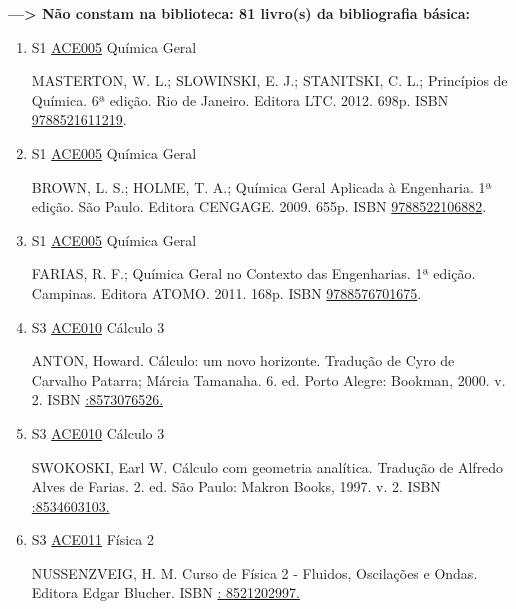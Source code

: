 \documentclass[12pt,a4paper]{book}
\begin{document}
 \textbf{---> Não constam na biblioteca: 81 livro(s) da bibliografia básica:}\label{FALTABIBBAS}
\begin{enumerate}
 \item S1 \hyperref[PUD:ACE005]{ACE005} Química Geral

 MASTERTON, W.  L.;  SLOWINSKI, E.  J.;  STANITSKI, C.  L.;  Princípios de Química.  6ª edição.  Rio de Janeiro.  Editora LTC.  2012.  698p.  ISBN \href{http://www.bn.br/site/pages/servicosProfissionais/agenciaISBN/isbnBusca/FbnBuscaISBNCatalogo.asp?pField=ISBN&pIntPagina=1&pISBN=21611219&nidbISBN=true&hidbISBN=true}{9788521611219}. 
 
 
 \item S1 \hyperref[PUD:ACE005]{ACE005} Química Geral

 BROWN, L.  S.;  HOLME, T.  A.;  Química Geral Aplicada à Engenharia.  1ª edição.  São Paulo.  Editora CENGAGE.  2009.  655p.  ISBN \href{http://www.bn.br/site/pages/servicosProfissionais/agenciaISBN/isbnBusca/FbnBuscaISBNCatalogo.asp?pField=ISBN&pIntPagina=1&pISBN=22106882&nidbISBN=true&hidbISBN=true}{9788522106882}. 
 
 
 \item S1 \hyperref[PUD:ACE005]{ACE005} Química Geral

 FARIAS, R.  F.;  Química Geral no Contexto das Engenharias.  1ª edição.  Campinas.  Editora ATOMO.  2011.  168p.  ISBN \href{http://www.bn.br/site/pages/servicosProfissionais/agenciaISBN/isbnBusca/FbnBuscaISBNCatalogo.asp?pField=ISBN&pIntPagina=1&pISBN=76701675&nidbISBN=true&hidbISBN=true}{9788576701675}.
 \item S3 \hyperref[PUD:ACE010]{ACE010} Cálculo 3

  ANTON, Howard.  Cálculo: um novo horizonte.  Tradução de Cyro de Carvalho Patarra;  Márcia Tamanaha.  6.  ed.  Porto Alegre: Bookman, 2000.  v. 2.  ISBN \href{http://www.google.com/search?hl=pt-BR&tbo=p&tbm=bks&q=isbn::8573076526.&num=10}{:8573076526.} 

 
 
 \item S3 \hyperref[PUD:ACE010]{ACE010} Cálculo 3

  SWOKOSKI, Earl W.  Cálculo com geometria analítica.  Tradução de Alfredo Alves de Farias.  2.  ed.  São Paulo: Makron Books, 1997.  v. 2.  ISBN \href{http://www.google.com/search?hl=pt-BR&tbo=p&tbm=bks&q=isbn::8534603103.&num=10}{:8534603103.}
 \item S3 \hyperref[PUD:ACE011]{ACE011} Física 2

  NUSSENZVEIG, H.  M.  Curso de Física 2 - Fluidos, Oscilações e Ondas.  Editora Edgar Blucher.  ISBN \href{http://www.google.com/search?hl=pt-BR&tbo=p&tbm=bks&q=isbn:: 8521202997.&num=10}{: 8521202997.} 


\end{enumerate}
\end{document}
